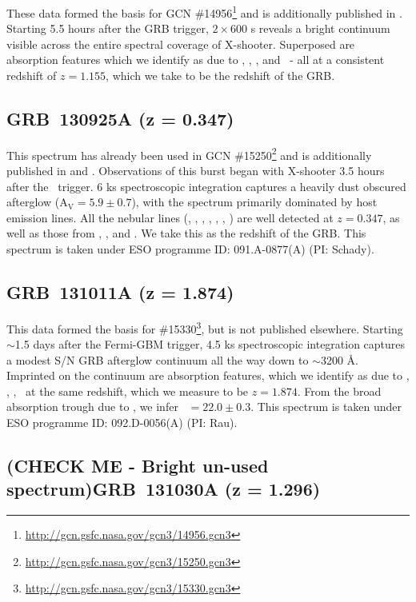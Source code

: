 \documentclass{aa}    %
\begin{document}
These data formed the basis for GCN
\#14956\footnote{\url{http://gcn.gsfc.nasa.gov/gcn3/14956.gcn3}} and is
additionally published in \citet{Kruhler2015}. Starting 5.5 hours after the GRB
trigger, $2\times600$ s reveals a bright continuum visible across the entire
spectral coverage of X-shooter. Superposed are absorption features which we
identify as due to \feii, \mgii, \mgi, and \caii~- all at a consistent redshift
of $z = 1.155$, which we take to be the redshift of the GRB.



\subsection{GRB~130925A (z = 0.347)}

This spectrum has already been used in GCN
\#15250\footnote{\url{http://gcn.gsfc.nasa.gov/gcn3/15250.gcn3}} and is
additionally published in \citet{Schady2015} and \citet{Kruhler2015}.
Observations of this burst began with X-shooter 3.5 hours after the
\swift~trigger. 6 ks spectroscopic integration captures a heavily dust obscured
afterglow (A$_\mathrm{V} = 5.9 \pm 0.7$\citep{Greiner2014}), with the spectrum
primarily dominated by host emission lines. All the nebular lines (\oii, \hg,
\hb, \oii, \ha, \nii, \sii) are well detected at $z = 0.347$, as well as those
from \pad, \pag, and \pab. We take this as the redshift of the GRB. This
spectrum is taken under ESO programme ID: 091.A-0877(A) (PI: Schady).

\subsection{GRB~131011A (z = 1.874)}	

This data formed the basis for
\#15330\footnote{\url{http://gcn.gsfc.nasa.gov/gcn3/15330.gcn3}}, but is not
published elsewhere. Starting $\sim$1.5 days after the Fermi-GBM trigger, 4.5 ks
spectroscopic integration captures a modest S/N GRB afterglow continuum all the
way down to $\sim$3200 \AA. Imprinted on the continuum are absorption features,
which we identify as due to \lya, \feii,  \mgii, \mgi~at the same redshift,
which we measure to be $z = 1.874$. From the broad absorption trough due to
\lya, we infer \nh~$= 22.0 \pm 0.3$. This spectrum is taken under ESO programme
ID: 092.D-0056(A) (PI: Rau).

\subsection{(CHECK ME - Bright un-used spectrum)GRB~131030A (z = 1.296)}	
\end{document}
